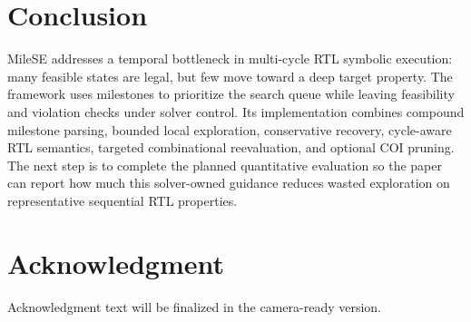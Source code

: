 \documentclass[conference]{IEEEtran}
\begin{document}
\section{Conclusion}
\label{sec:conclusion}
MileSE addresses a temporal bottleneck in multi-cycle RTL symbolic execution: many feasible states are legal, but few move toward a deep target property. The framework uses milestones to prioritize the search queue while leaving feasibility and violation checks under solver control. Its implementation combines compound milestone parsing, bounded local exploration, conservative recovery, cycle-aware RTL semantics, targeted combinational reevaluation, and optional COI pruning. The next step is to complete the planned quantitative evaluation so the paper can report how much this solver-owned guidance reduces wasted exploration on representative sequential RTL properties.

\section*{Acknowledgment}
Acknowledgment text will be finalized in the camera-ready version.



\end{document}
